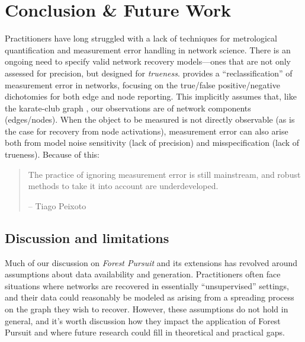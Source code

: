 \documentclass[%
	12pt,
		oneside,
		letterpaper
]{book}
\begin{document}

\chapter{Conclusion \& Future Work}\label{sec-conclusion}

Practitioners have long struggled with a lack of techniques for
metrological quantification and measurement error handling in network
science. There is an ongoing need to specify valid network recovery
models---ones that are not only assessed for precision, but designed for
\emph{trueness}. \textcite{Measurementerrornetwork_Wang2012} provides a
``reclassification'' of measurement error in networks, focusing on the
true/false positive/negative dichotomies for both edge and node
reporting. This implicitly assumes that, like the karate-club graph
\autocite{InformationFlowModel_Zachary1977}, our observations are of
network components (edges/nodes). When the object to be measured is not
directly observable (as is the case for recovery from node activations),
measurement error can also arise both from model noise sensitivity (lack
of precision) and misspecification (lack of trueness). Because of this:

\singlespacing

\begin{quote}
The practice of ignoring measurement error is still mainstream, and
robust methods to take it into account are underdeveloped.

\hfill -- Tiago Peixoto
\autocite{ReconstructingNetworksUnknown_Peixoto2018}
\end{quote}

\doublespacing

\section{Discussion and limitations}\label{discussion-and-limitations}

Much of our discussion on \emph{Forest Pursuit} and its extensions has
revolved around assumptions about data availability and generation.
Practitioners often face situations where networks are recovered in
essentially ``unsupervised'' settings, and their data could reasonably
be modeled as arising from a spreading process on the graph they wish to
recover. However, these assumptions do not hold in general, and it's
worth discussion how they impact the application of Forest Pursuit and
where future research could fill in theoretical and practical gaps.
\end{document}
